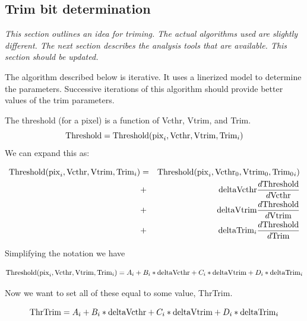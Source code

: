 %
%

\subsection{Trim bit determination}

{\it This section outlines an idea for triming. The actual
algorithms used are slightly different. The next section
describes the analysis tools that are available. This 
section should be updated.}

The algorithm described below is iterative. It uses a linerized
model to determine the parameters. Successive iterations of this
algorithm should provide better values of the trim parameters.

The threshold (for a pixel) is a function of Vcthr, Vtrim, and Trim.
\begin{equation}
{\rm Threshold}={\rm Threshold}({\rm pix}_i,{\rm Vcthr},{\rm Vtrim},
                {\rm Trim}_i)
\end{equation}
We can expand this as:

\begin{eqnarray*}
{\rm Threshold}({\rm pix}_i,{\rm Vcthr},{\rm Vtrim},{\rm Trim}_i)&=&
 {\rm Threshold}({\rm pix}_i,{\rm Vcthr}_0,{\rm Vtrim}_0,{{\rm Trim}_0}_i)\\
                    &+&{\rm deltaVcthr}{d{\rm Threshold}\over d{\rm Vcthr}}\\
                    &+&{\rm deltaVtrim}{d{\rm Threshold}\over d{\rm Vtrim}}\\
                    &+&{\rm deltaTrim}_i{d{\rm Threshold}\over d{\rm Trim}}
\end{eqnarray*}

Simplifying the notation we have

\begin{equation}
{\rm Threshold}({\rm pix}_i,{\rm Vcthr},{\rm Vtrim},{\rm Trim}_i)=
           A_i+B_i*{\rm deltaVcthr}+
           C_i*{\rm deltaVtrim}+
           D_i*{\rm deltaTrim}_i
\end{equation}

Now we want to set all of these equal to some value, {\rm ThrTrim}.

\begin{equation}
  {\rm ThrTrim}=A_i+B_i*{\rm deltaVcthr}+C_i*{\rm deltaVtrim}+
  D_i*{\rm deltaTrim}_i
\end{equation}

